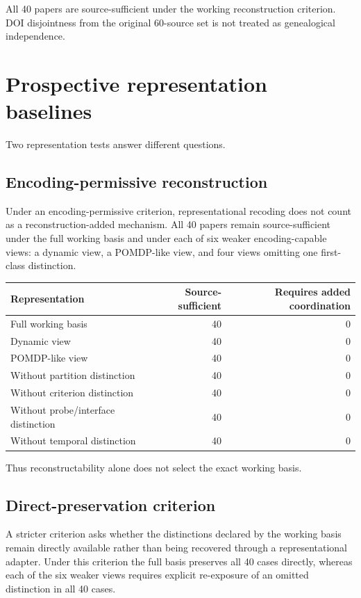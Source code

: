 \documentclass[11pt]{article}
\begin{document}
All 40 papers are source-sufficient under the working reconstruction criterion. DOI disjointness from the original 60-source set is not treated as genealogical independence.

\section{Prospective representation baselines}

Two representation tests answer different questions.

\subsection{Encoding-permissive reconstruction}

Under an encoding-permissive criterion, representational recoding does not count as a reconstruction-added mechanism. All 40 papers remain source-sufficient under the full working basis and under each of six weaker encoding-capable views: a dynamic view, a POMDP-like view, and four views omitting one first-class distinction.

\begin{center}
\begin{tabular}{lrr}
\toprule
Representation & Source-sufficient & Requires added coordination \\
\midrule
Full working basis & 40 & 0 \\
Dynamic view & 40 & 0 \\
POMDP-like view & 40 & 0 \\
Without partition distinction & 40 & 0 \\
Without criterion distinction & 40 & 0 \\
Without probe/interface distinction & 40 & 0 \\
Without temporal distinction & 40 & 0 \\
\bottomrule
\end{tabular}
\end{center}

Thus reconstructability alone does not select the exact working basis.

\subsection{Direct-preservation criterion}

A stricter criterion asks whether the distinctions declared by the working basis remain directly available rather than being recovered through a representational adapter. Under this criterion the full basis preserves all 40 cases directly, whereas each of the six weaker views requires explicit re-exposure of an omitted distinction in all 40 cases.
\end{document}
